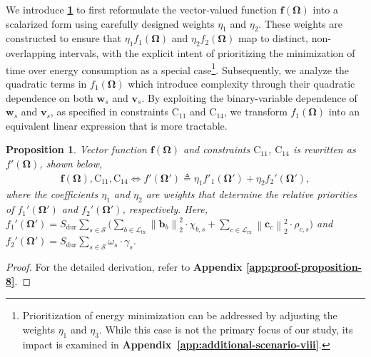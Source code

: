\documentclass[10pt,journal,compsoc]{IEEEtran}
\newtheorem{proposition}{Proposition}
\theoremstyle{myremark}
\theoremstyle{myexample}
\begin{document}
We introduce \textbf{\cref{thm:proposition-9}} to first reformulate the vector-valued function $ \mathbf{f} \left( \boldsymbol{\Omega} \right) $ into a scalarized form using carefully designed weights $ \eta_1 $ and $ \eta_2 $. These weights are constructed to ensure that $ \eta_1 f_1 \left( \boldsymbol{\Omega} \right) $ and $ \eta_2 f_2 \left( \boldsymbol{\Omega} \right) $ map to distinct, non-overlapping intervals, with the explicit intent of prioritizing the minimization of time over energy consumption as a special case\footnote{Prioritization of energy minimization can be addressed by adjusting the weights $ \eta_1 $ and $ \eta_3 $. While this case is not the primary focus of our study, its impact is examined in \textbf{Appendix~\ref{app:additional-scenario-viii}}.}. Subsequently, we analyze the quadratic terms in $ f_1 \left( \boldsymbol{\Omega} \right) $ which introduce complexity through their quadratic dependence on both $ \mathbf{w}_s $ and $ \mathbf{v}_s $. By exploiting the binary-variable dependence of $ \mathbf{w}_s $ and $ \mathbf{v}_s $, as specified in constraints $ \mathrm{C}_{11} $ and $ \mathrm{C}_{14} $, we transform $ f_1 \left( \boldsymbol{\Omega} \right) $ into an equivalent linear expression that is more tractable.
\begin{proposition} \label{thm:proposition-9}
	Vector function $ \mathbf{f} \left( \boldsymbol{\Omega} \right) $ and constraints $ \mathrm{C}_{11} $, $ \mathrm{C}_{14} $ is rewritten as $ f' \left( \boldsymbol{\Omega} \right) $, shown below,
	\begin{align*}
			\mathbf{f} \left( \boldsymbol{\Omega} \right), \mathrm{C}_{11}, \mathrm{C}_{14} \Leftrightarrow f' \left( \boldsymbol{\Omega}' \right) \triangleq \eta_1  f'_1 \left( \boldsymbol{\Omega}' \right) + \eta_2 f_2' \left( \boldsymbol{\Omega}' \right), 
	\end{align*}
	where the coefficients $ \eta_1 $ and $ \eta_2 $ are weights that determine the relative priorities of $ f_1' \left( \boldsymbol{\Omega}' \right) $ and $ f_2' \left( \boldsymbol{\Omega}' \right) $, respectively. Here, $ f_1' \left( \boldsymbol{\Omega}' \right) = S_\mathrm{dur} \sum_{s \in \mathcal{S}} \big( \sum_{b \in \mathcal{L}_\mathrm{tx}}  \left\| \mathbf{b}_b \right\|_2^2 \cdot \chi_{b,s} + \sum_{c \in \mathcal{L}_\mathrm{rx}} \left\| \mathbf{c}_c \right\|_2^2 \cdot \rho_{c,s} \big) $ and $ f_2' \left( \boldsymbol{\Omega}' \right) = S_\mathrm{dur} \sum_{s \in \mathcal{S}} \omega_{s} \cdot \gamma_s $.  
\end{proposition} 
\begin{proof} 
	For the detailed derivation, refer to \textbf{Appendix \ref{app:proof-proposition-8}}.
\end{proof}
\end{document}
